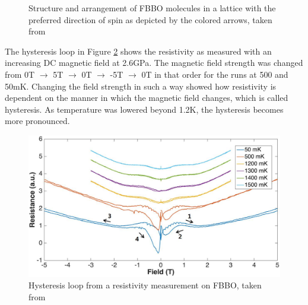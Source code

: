 \documentclass[11pt,onecolumn]{article}
\begin{document}
\begin{figure}[ht]
	\centering
	\hspace{2mm}
	\hspace{2mm}
	\caption{Structure and arrangement of FBBO molecules in a lattice with the preferred direction of spin as depicted by the colored arrows, taken from \cite{FBBO}}
	\label{fig:12}
\end{figure}

The hysteresis loop in Figure \ref{fig:10} shows the resistivity as measured with an increasing DC magnetic field at 2.6GPa. The magnetic field strength was changed from 0T $\rightarrow$ 5T $\rightarrow$ 0T $\rightarrow$ -5T $\rightarrow$ 0T in that order for the runs at 500 and 50mK. Changing the field strength in such a way showed how resistivity is dependent on the manner in which the magnetic field changes, which is called hysteresis. As temperature was lowered beyond 1.2K, the hysteresis becomes more pronounced.\cite{Di_thesis}\\

\begin{figure}[ht]
	\centering
	\includegraphics[width=.7\columnwidth]{figures/hysteresis.png}
	\caption{Hysteresis loop from a resistivity measurement on FBBO, taken from \cite{Di_thesis}}
	\label{fig:10}
\end{figure}
\end{document}
